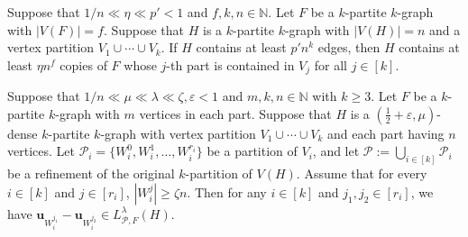 \documentclass[10pt,a4paper]{amsart}
\begin{document}
\begin{prop}\label{super}
     Suppose that $1/n\ll \eta \ll p'<1$ and $f,k,n\in \mathbb{N}$.  Let $F$ be a $k$-partite $k$-graph with $|V(F)|=f$. Suppose that $H$ is a $k$-partite $k$-graph with $|V(H)|=n$ and a vertex partition $V_1\cup \cdots \cup V_k$. If $H$ contains at least $p' n^k$ edges, then $H$ contains at least $\eta n^{f}$ copies of $F$ whose $j$-th part is contained in $V_{j}$ for all $j\in[k]$.
\end{prop}

\begin{lemma}\label{transferral}
    Suppose that $1/n \ll \mu \ll \lambda \ll \zeta, \varepsilon<1$ and $m,k,n\in \mathbb{N}$ with $k\geq 3$. Let $F$ be a $k$-partite $k$-graph with $m$ vertices in each part. Suppose that $H$ is a $(\frac{1}{2}+\varepsilon, \mu)$-dense $k$-partite $k$-graph with vertex partition $V_1\cup \cdots \cup V_k$ and each part having $n$ vertices. Let $\mathcal{P}_i =\{W_i^0, W_i^1,\dots,W_{i}^{r_i}\}$ be a partition of $V_i$, and let $\mathcal{P}:=\bigcup _{i\in [k]}\mathcal{P}_i$ be a refinement of the original $k$-partition of $V(H)$. Assume that for every $i\in [k]$ and $j\in [r_i]$, $|W_i^{j}|\geq \zeta n$. Then for any $i\in [k]$ and $j_1, j_2\in [r_i]$, we have $\mathbf{u}_{W_i^{j_1}} -\mathbf{u}_{W_i^{j_2}} \in  L^{\lambda}_{\mathcal{P},F}(H)$.
\end{lemma}
\end{document}
